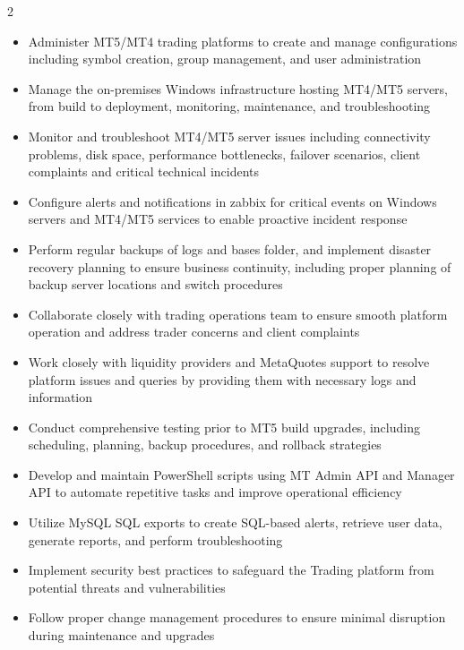 \documentclass[11pt,a3paper,ragged2e,withhyper]{altacv}
\begin{document}
\begin{paracol}{2}
\begin{itemize}
  \item Administer MT5/MT4 trading platforms to create and manage configurations including symbol creation, group management, and user administration
  \item Manage the on-premises Windows infrastructure hosting MT4/MT5 servers, from build to deployment, monitoring, maintenance, and troubleshooting
  \item Monitor and troubleshoot MT4/MT5 server issues including connectivity problems, disk space, performance bottlenecks, failover scenarios, client complaints and critical technical incidents
  \item Configure alerts and notifications in zabbix for critical events on Windows servers and MT4/MT5 services to enable proactive incident response
  \item Perform regular backups of logs and bases folder, and implement disaster recovery planning to ensure business continuity, including proper planning of backup server locations and switch procedures
  \item Collaborate closely with trading operations team to ensure smooth platform operation and address trader concerns and client complaints
  \item Work closely with liquidity providers and MetaQuotes support to resolve platform issues and queries by providing them with necessary logs and information
  \item Conduct comprehensive testing prior to MT5 build upgrades, including scheduling, planning, backup procedures, and rollback strategies
  \item Develop and maintain PowerShell scripts using MT Admin API and Manager API to automate repetitive tasks and improve operational efficiency
  \item Utilize MySQL SQL exports to create SQL-based alerts, retrieve user data, generate reports, and perform troubleshooting
  \item Implement security best practices to safeguard the Trading platform from potential threats and vulnerabilities
  \item Follow proper change management procedures to ensure minimal disruption during maintenance and upgrades
\end{itemize}
\divider
{}
\begin{itemize}

\end{itemize}
\end{paracol}
\end{document}
